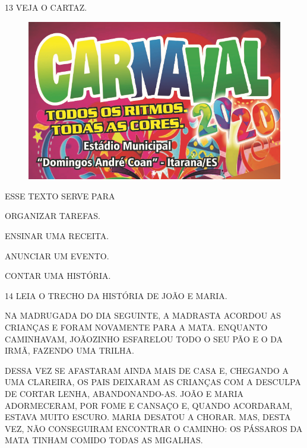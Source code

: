 \num{13} VEJA O CARTAZ.

\begin{figure}[H]
\centering
\includegraphics[width=\textwidth]{media/image204.png}
\end{figure}

ESSE TEXTO SERVE PARA

\begin{escolha}[itemsep=-5pt]
\item ORGANIZAR TAREFAS.

\item ENSINAR UMA RECEITA.

\item ANUNCIAR UM EVENTO.

\item CONTAR UMA HISTÓRIA.
\end{escolha}

\num{14} LEIA O TRECHO DA HISTÓRIA DE JOÃO E MARIA.

\begin{myquote}
NA MADRUGADA DO DIA SEGUINTE, A MADRASTA ACORDOU AS CRIANÇAS E FORAM
NOVAMENTE PARA A MATA. ENQUANTO CAMINHAVAM, JOÃOZINHO ESFARELOU TODO O
SEU PÃO E O DA IRMÃ, FAZENDO UMA TRILHA.

DESSA VEZ SE AFASTARAM AINDA
MAIS DE CASA E, CHEGANDO A UMA CLAREIRA, OS PAIS DEIXARAM AS CRIANÇAS
COM A DESCULPA DE CORTAR LENHA, ABANDONANDO-AS. JOÃO E MARIA
ADORMECERAM, POR FOME E CANSAÇO E, QUANDO ACORDARAM, ESTAVA MUITO
ESCURO. MARIA DESATOU A CHORAR. MAS, DESTA VEZ, NÃO CONSEGUIRAM
ENCONTRAR O CAMINHO: OS PÁSSAROS DA MATA TINHAM COMIDO TODAS AS
MIGALHAS.

\end{myquote}

